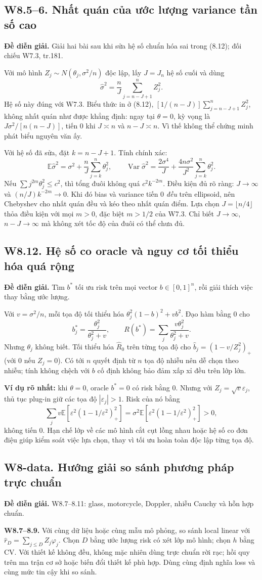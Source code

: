 \documentclass[11pt,a4paper]{article}
\newcommand{\E}{\mathbb E}\newcommand{\Pp}{\mathbb P}
\DeclareMathOperator{\Var}{Var}\DeclareMathOperator{\Cov}{Cov}
\newcommand{\supp}[3]{\subsection{#1. #2}\label{s:#1}\textbf{Đề diễn giải.} #3\par}
\begin{document}
\supp{W8.5--6}{Nhất quán của ước lượng variance tần số cao}{Giải hai bài sau khi sửa hệ số chuẩn hóa sai trong (8.12); đối chiếu W7.3, tr.181.}
Với mô hình $Z_j\sim N(\theta_j,\sigma^2/n)$ độc lập, lấy $J=J_n$ hệ số cuối và dùng
\[
\widehat\sigma^2=\frac nJ\sum_{j=n-J+1}^n Z_j^2.
\]
Hệ số này đúng với W7.3. Biểu thức in ở (8.12), $[1/(n-J)]\sum_{j=n-J+1}^nZ_j^2$, không nhất quán như được khẳng định: ngay tại $\theta=0$, kỳ vọng là $J\sigma^2/[n(n-J)]$, tiến 0 khi $J\asymp n$ và $n-J\asymp n$. Vì thế không thể chứng minh phát biểu nguyên văn ấy.

Với hệ số đã sửa, đặt $k=n-J+1$. Tính chính xác:
\[
\E\widehat\sigma^2=\sigma^2+\frac nJ\sum_{j=k}^n\theta_j^2,\qquad
\Var\widehat\sigma^2=\frac{2\sigma^4}{J}+\frac{4n\sigma^2}{J^2}\sum_{j=k}^n\theta_j^2.
\]
Nếu $\sum j^{2m}\theta_j^2\le c^2$, thì tổng đuôi không quá $c^2 k^{-2m}$. Điều kiện đủ rõ ràng:
$J\to\infty$ và $(n/J)k^{-2m}\to0$. Khi đó bias và variance tiến 0 \emph{đều} trên ellipsoid, nên Chebyshev cho nhất quán đều và kéo theo nhất quán điểm. Lựa chọn $J=\lfloor n/4\rfloor$ thỏa điều kiện với mọi $m>0$, đặc biệt $m>1/2$ của W7.3. Chỉ biết $J\to\infty$, $n-J\to\infty$ mà không xét tốc độ của đuôi có thể chưa đủ.

\supp{W8.12}{Hệ số co oracle và nguy cơ tối thiểu hóa quá rộng}{Tìm $b^*$ tối ưu risk trên mọi vector $b\in[0,1]^n$, rồi giải thích việc thay bằng ước lượng.}
Với $v=\sigma^2/n$, mỗi tọa độ tối thiểu hóa
$\theta_j^2(1-b)^2+vb^2$. Đạo hàm bằng 0 cho
\[
b_j^*=\frac{\theta_j^2}{\theta_j^2+v},\qquad
R(b^*)=\sum_j\frac{v\theta_j^2}{\theta_j^2+v}.
\]
Nhưng $\theta_j$ không biết. Tối thiểu hóa $\widehat R_0$ trên từng tọa độ cho
$\widehat b_j=(1-v/Z_j^2)_+$ (với 0 nếu $Z_j=0$). Có tới $n$ quyết định từ $n$ tọa độ nhiễu nên dễ chọn theo nhiễu; tính không chệch với $b$ cố định không bảo đảm xấp xỉ đều trên lớp lớn.

\textbf{Ví dụ rõ nhất:} khi $\theta=0$, oracle $b^*=0$ có risk bằng 0. Nhưng với $Z_j=\sqrt v\varepsilon_j$, thủ tục plug-in giữ các tọa độ $|\varepsilon_j|>1$. Risk của nó bằng
\[
\sum_jv\E\left[\varepsilon^2(1-1/\varepsilon^2)_+^2\right]
=\sigma^2\E\left[\varepsilon^2(1-1/\varepsilon^2)_+^2\right]>0,
\]
không tiến 0. Hạn chế lớp về các mô hình cắt cụt lồng nhau hoặc hệ số co đơn điệu giúp kiểm soát việc lựa chọn, thay vì tối ưu hoàn toàn độc lập từng tọa độ.

\supp{W8-data}{Hướng giải so sánh phương pháp trực chuẩn}{W8.7--8.11: glass, motorcycle, Doppler, nhiễu Cauchy và hỗn hợp chuẩn.}
\textbf{W8.7--8.9.} Với cùng dữ liệu hoặc cùng mẫu mô phỏng, so sánh local linear với $\widehat r_D=\sum_{j\le D}Z_j\varphi_j$. Chọn $D$ bằng ước lượng risk có xét lớp mô hình; chọn $h$ bằng CV. Với thiết kế không đều, không mặc nhiên dùng trực chuẩn rời rạc; hồi quy trên ma trận cơ sở hoặc biến đổi thiết kế phù hợp. Dùng cùng định nghĩa loss và cùng mức tin cậy khi so sánh.
\end{document}

